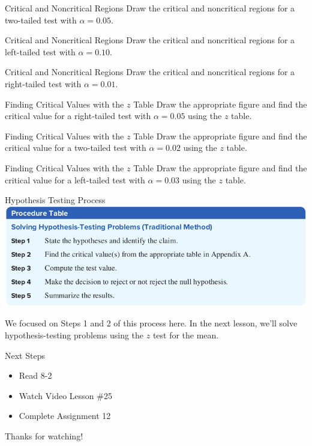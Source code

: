 \documentclass[t, aspectratio=169]{beamer}
\newcommand{\?}{\stackrel{?}{=}}
\begin{document}
	\begin{frame}{Critical and Noncritical Regions}
		Draw the critical and noncritical regions for a two-tailed test with $\alpha = 0.05$.
	\end{frame}

	\begin{frame}{Critical and Noncritical Regions}
		Draw the critical and noncritical regions for a left-tailed test with $\alpha = 0.10$.
	\end{frame}

	\begin{frame}{Critical and Noncritical Regions}
		Draw the critical and noncritical regions for a right-tailed test with $\alpha = 0.01$.
	\end{frame}

	\begin{frame}{Finding Critical Values with the $z$ Table}
		Draw the appropriate figure and find the critical value for a right-tailed test with $\alpha = 0.05$ using the $z$ table.
	\end{frame}

	\begin{frame}{Finding Critical Values with the $z$ Table}
		Draw the appropriate figure and find the critical value for a two-tailed test with $\alpha = 0.02$ using the $z$ table.
	\end{frame}

	\begin{frame}{Finding Critical Values with the $z$ Table}
		Draw the appropriate figure and find the critical value for a left-tailed test with $\alpha = 0.03$ using the $z$ table.
	\end{frame}

	\begin{frame}{Hypothesis Testing Process}
		\includegraphics[width=\textwidth]{hyp-process.png} \pause
		
		We focused on Steps 1 and 2 of this process here. In the next lesson, we'll solve hypothesis-testing problems using the $z$ test for the mean.
	\end{frame}

	\begin{frame}{Next Steps}
		\begin{itemize}
			\item Read 8-2
			\item Watch Video Lesson \#25
			\item Complete Assignment 12
		\end{itemize}
	
		\vfill
		
		Thanks for watching!
	\end{frame}
\end{document}
